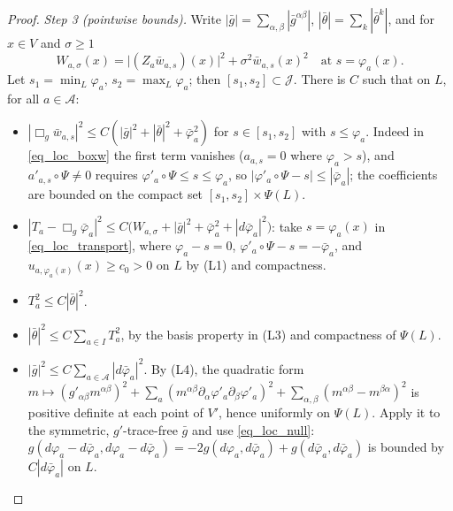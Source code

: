 \documentclass[11pt,a4paper,reqno]{amsart}
\theoremstyle{definition}
\numberwithin{equation}{section}
\newcommand{\cA}{\mathcal{A}}
\newcommand{\cJ}{\mathcal{J}}
\newcommand{\bg}{\bar g}
\newcommand{\bth}{\bar\theta}
\newcommand{\bphi}{\bar\varphi}
\newcommand{\bw}{\bar w}
\begin{document}
\begin{proof}
\emph{Step 3 (pointwise bounds).} Write $|\bg|=\sum_{\alpha,\beta}|\bg^{\alpha\beta}|$, $|\bth|=\sum_k|\bth^k|$, and for
$x\in V$ and $\sigma\ge1$
\[
W_{a,\sigma}(x)=\bigl|(Z_a\bw_{a,s})(x)\bigr|^2+\sigma^2\bw_{a,s}(x)^2\quad\text{at }s=\varphi_a(x).
\]
Let $s_1=\min_L\varphi_a$, $s_2=\max_L\varphi_a$; then $[s_1,s_2]\subset\cJ$. There is $C$ such that on $L$, for all $a\in\cA$:
\begin{itemize}
\item[\textup{(B1)}] $|\Box_g\bw_{a,s}|^2\le C(|\bg|^2+|\bth|^2+\bphi_a^2)$ for $s\in[s_1,s_2]$ with $s\le\varphi_a$. Indeed in
\eqref{eq_loc_boxw} the first term vanishes ($a_{a,s}=0$ where $\varphi_a>s$), and $a'_{a,s}\circ\Psi\ne0$ requires
$\varphi'_a\circ\Psi\le s\le\varphi_a$, so $|\varphi'_a\circ\Psi-s|\le|\bphi_a|$; the coefficients are bounded on the compact set
$[s_1,s_2]\times\Psi(L)$.
\item[\textup{(B2)}] $|T_a-\Box_g\bphi_a|^2\le C\bigl(W_{a,\sigma}+|\bg|^2+\bphi_a^2+|d\bphi_a|^2\bigr)$: take
$s=\varphi_a(x)$ in \eqref{eq_loc_transport}, where $\varphi_a-s=0$, $\varphi'_a\circ\Psi-s=-\bphi_a$, and
$u_{a,\varphi_a(x)}(x)\ge c_0>0$ on $L$ by \textup{(L1)} and compactness.
\item[\textup{(B3)}] $T_a^2\le C|\bth|^2$.
\item[\textup{(B4)}] $|\bth|^2\le C\sum_{a\in I}T_a^2$, by the basis property in \textup{(L3)} and compactness of $\Psi(L)$.
\item[\textup{(B5)}] $|\bg|^2\le C\sum_{a\in\cA}|d\bphi_a|^2$. By \textup{(L4)}, the quadratic form
$m\mapsto(g'_{\alpha\beta}m^{\alpha\beta})^2+\sum_a(m^{\alpha\beta}\partial_\alpha\varphi'_a\partial_\beta\varphi'_a)^2+\sum_{\alpha,\beta}(m^{\alpha\beta}-m^{\beta\alpha})^2$
is positive definite at each point of $V'$, hence uniformly on $\Psi(L)$. Apply it to the symmetric, $g'$-trace-free $\bg$ and
use \eqref{eq_loc_null}: $g(d\varphi_a-d\bphi_a,d\varphi_a-d\bphi_a)=-2g(d\varphi_a,d\bphi_a)+g(d\bphi_a,d\bphi_a)$ is bounded by
$C|d\bphi_a|$ on $L$.
\end{itemize}


\end{proof}
\end{document}
